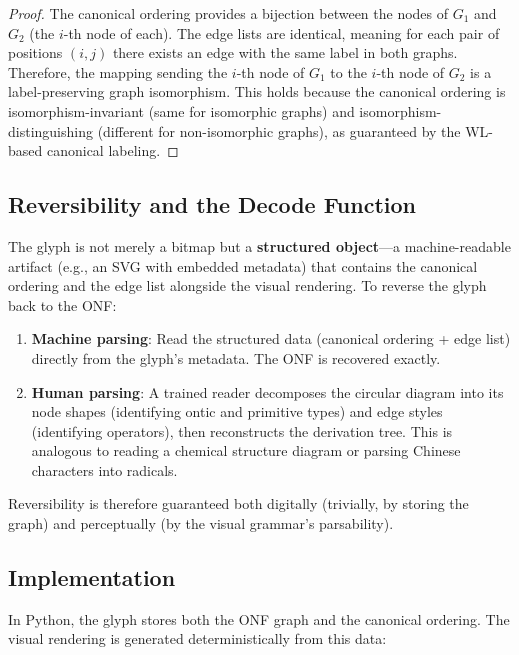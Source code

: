 \documentclass[12pt, letterpaper]{book}
\begin{document}
\begin{proof}
The canonical ordering provides a bijection between the nodes of $G_1$ and $G_2$ (the $i$-th node of each). The edge lists are identical, meaning for each pair of positions $(i, j)$ there exists an edge with the same label in both graphs. Therefore, the mapping sending the $i$-th node of $G_1$ to the $i$-th node of $G_2$ is a label-preserving graph isomorphism. This holds because the canonical ordering is isomorphism-invariant (same for isomorphic graphs) and isomorphism-distinguishing (different for non-isomorphic graphs), as guaranteed by the WL-based canonical labeling.
\end{proof}

\subsection{Reversibility and the Decode Function}

The glyph is not merely a bitmap but a \textbf{structured object}---a machine-readable artifact (e.g., an SVG with embedded metadata) that contains the canonical ordering and the edge list alongside the visual rendering. To reverse the glyph back to the ONF:

\begin{enumerate}[label=(\roman*)]
    \item \textbf{Machine parsing}: Read the structured data (canonical ordering + edge list) directly from the glyph's metadata. The ONF is recovered exactly.
    \item \textbf{Human parsing}: A trained reader decomposes the circular diagram into its node shapes (identifying ontic and primitive types) and edge styles (identifying operators), then reconstructs the derivation tree. This is analogous to reading a chemical structure diagram or parsing Chinese characters into radicals.
\end{enumerate}

Reversibility is therefore guaranteed both digitally (trivially, by storing the graph) and perceptually (by the visual grammar's parsability).

\subsection{Implementation}

In Python, the glyph stores both the ONF graph and the canonical ordering. The visual rendering is generated deterministically from this data:
\end{document}
